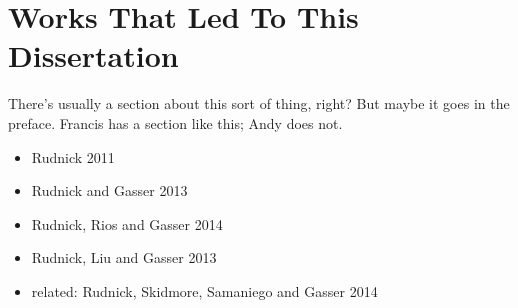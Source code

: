 \section{Works That Led To This Dissertation}
There's usually a section about this sort of thing, right?
But maybe it goes in the preface.
Francis has a section like this; Andy does not.

\begin{itemize}
\item Rudnick 2011 \cite{rudnick:2011:RANLPStud}
\item Rudnick and Gasser 2013 \cite{rudnick-gasser:2013:HyTra}
\item Rudnick, Rios and Gasser 2014 \cite{rudnick:saltmil2014}
\item Rudnick, Liu and Gasser 2013 \cite{rudnick-liu-gasser:2013:SemEval-2013}
\item related: Rudnick, Skidmore, Samaniego and Gasser 2014 \cite{RUDNICK14.151}
\end{itemize}

